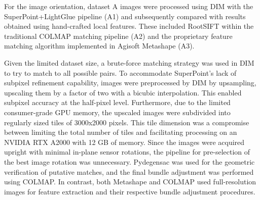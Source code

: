 For the image orientation, dataset A images were processed using DIM with the SuperPoint+LightGlue pipeline (A1) and subsequently compared with results obtained using hand-crafted local features.  
These included RootSIFT within the traditional COLMAP matching pipeline (A2) and the proprietary feature matching algorithm implemented in Agisoft Metashape (A3).

Given the limited dataset size, a brute-force matching strategy was used in DIM to try to match to all possible pairs. 
To accommodate SuperPoint's lack of subpixel refinement capability, images were preprocessed by DIM by upsampling, upscaling them by a factor of two with a bicubic interpolation. 
This enabled subpixel accuracy at the half-pixel level. 
Furthermore, due to the limited consumer-grade GPU memory, the upscaled images were subdivided into regularly sized tiles of 3000x2000 pixels.  
This tile dimension was a compromise between limiting the total number of tiles and facilitating processing on an NVIDIA RTX A2000 with 12 GB of memory. 
Since the images were acquired upright with minimal in-plane sensor rotations, the pipeline for pre-selection of the best image rotation was unnecessary.  
Pydegensac was used for the geometric verification of putative matches, and the final bundle adjustment was performed using COLMAP. 
In contrast, both Metashape and COLMAP used full-resolution images for feature extraction and their respective bundle adjustment procedures. 


